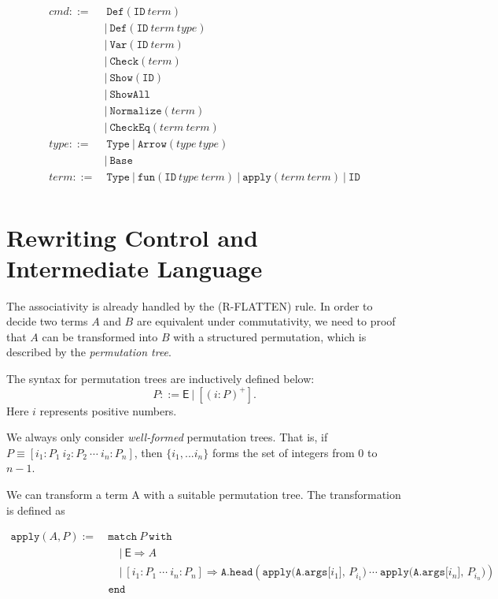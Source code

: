 \documentclass{article}
\begin{document}
\begin{align*}
    cmd ::=&\ \texttt{Def}(\texttt{ID}\ term) \\
        &|\ \texttt{Def}(\texttt{ID}\ term\ type) \\
        &|\ \texttt{Var}(\texttt{ID}\ term) \\
        &|\ \texttt{Check}(term) \\
        &|\ \texttt{Show}(\texttt{ID}) \\
        &|\ \texttt{ShowAll} \\
        &|\ \texttt{Normalize}(term) \\
        &|\ \texttt{CheckEq}(term\ term) \\
    type ::=&\ \texttt{Type}\ |\ \texttt{Arrow}(type\ type) \\
            &|\ \texttt{Base} \\
    term ::=&\ \texttt{Type}\ |\ \texttt{fun}(\texttt{ID}\ type\ term)\ |\ \texttt{apply}(term\ term)\ |\ \texttt{ID} \\
\end{align*}


\section{Rewriting Control and Intermediate Language}
The associativity is already handled by the (R-FLATTEN) rule. In order to decide two terms $A$ and $B$ are equivalent under commutativity, we need to proof that $A$ can be transformed into $B$ with a structured permutation, which is described by the \textit{permutation tree}.

\begin{definition}
    The syntax for permutation trees are inductively defined below:
    \[
    P ::= \mathsf{E}\ |\ [(i:P)^+].
    \]
    Here $i$ represents positive numbers.
\end{definition}
We always only consider \textit{well-formed} permutation trees. That is, if $P \equiv [i_1:P_1\ i_2:P_2\ \cdots\ i_n:P_n]$, then $\{i_1, ... i_n\}$ forms the set of integers from $0$ to $n-1$.

We can transform a term A with a suitable permutation tree. The transformation is defined as

\begin{align*}
    \texttt{apply}(A, P) :=\ & \texttt{match}\ P\ \texttt{with} \\
    & \quad |\ \textsf{E} \Rightarrow A \\
    & \quad |\ [i_1:P_1\ \cdots\ i_n:P_n] \Rightarrow \texttt{A.head}(\texttt{apply(A.args[$i_1$], $P_{i_1}$)}\ \cdots\ \texttt{apply(A.args[$i_n$], $P_{i_n}$)}) \\
    & \texttt{end}
\end{align*}

\clearpage



\clearpage



\end{document}

